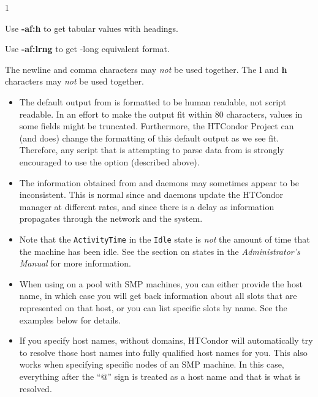 \begin{ManPage}{\label{man-condor-status}}{1}
\begin{Options}
{    Use \textbf{-af:h} to get tabular values with headings.

    Use \textbf{-af:lrng} to get -long equivalent format.

    The newline and comma characters may \emph{not} be used together.
    The \textbf{l} and \textbf{h} characters may \emph{not} be used
    together.
    }
\end{Options}

\GenRem
\begin{itemize}
	\item The default output from  is formatted to
	be human readable, not script readable.
	In an effort to make the output fit within 80 characters,
	values in some fields might be truncated.
	Furthermore, the HTCondor Project can (and does) change the
	formatting of this default output as we see fit.
	Therefore, any script that is attempting to parse data from
	 is strongly encouraged to use the
	 option (described above).

	\item The information obtained from  and 
	daemons
	may sometimes appear to be inconsistent.  This is normal since
	  and  daemons update the HTCondor
	manager at different rates, and since there is a
	delay as information propagates through the network and the system.

	\item Note that the \texttt{ActivityTime} in the \texttt{Idle} state is
	\emph{not} the amount of time that the machine has been idle.  See the
	section on  states in the \emph{Administrator's Manual}
	for more information.

	\item When using  on a pool with SMP machines,
	you can either provide the host name, in which case you will
	get back information about all slots that are represented on
	that host, or you can list specific slots by name.
	See the examples below for details.

	\item If you specify host names, without domains, HTCondor will
	automatically try to resolve those host names into fully
	qualified host names for you.
	This also works when specifying specific nodes of an SMP
	machine.
	In this case, everything after the ``@'' sign is treated as a
	host name and that is what is resolved.


\end{itemize}
\end{ManPage}
